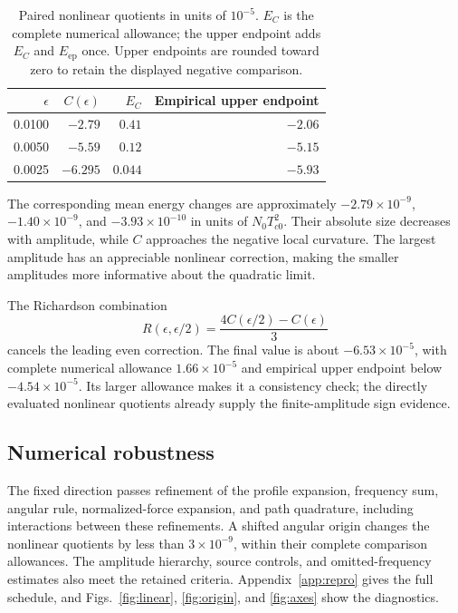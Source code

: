 \documentclass[11pt,a4paper]{article}
\newcommand{\Tc}{T_{c0}}
\begin{document}
\begin{table}[tbp]\centering
\caption{Paired nonlinear quotients in units of $10^{-5}$. $E_C$ is the complete numerical allowance; the upper endpoint adds $E_C$ and $E_{\mathrm{ep}}$ once. Upper endpoints are rounded toward zero to retain the displayed negative comparison.}\label{tab:nonlinear}
\begin{tabular}{rrrr}\toprule
$\epsilon$ & $C(\epsilon)$ & $E_C$ & Empirical upper endpoint\\\midrule
0.0100 & $-2.79$ & $0.41$ & $-2.06$\\
0.0050 & $-5.59$ & $0.12$ & $-5.15$\\
0.0025 & $-6.295$ & $0.044$ & $-5.93$\\\bottomrule
\end{tabular}
\end{table}

The corresponding mean energy changes are approximately $-2.79\times10^{-9}$, $-1.40\times10^{-9}$, and $-3.93\times10^{-10}$ in units of $N_0\Tc^2$. Their absolute size decreases with amplitude, while $C$ approaches the negative local curvature. The largest amplitude has an appreciable nonlinear correction, making the smaller amplitudes more informative about the quadratic limit.

The Richardson combination
\begin{equation}\label{eq:richardson}
 R(\epsilon,\epsilon/2)=\frac{4C(\epsilon/2)-C(\epsilon)}{3}
\end{equation}
cancels the leading even correction. The final value is about $-6.53\times10^{-5}$, with complete numerical allowance $1.66\times10^{-5}$ and empirical upper endpoint below $-4.54\times10^{-5}$. Its larger allowance makes it a consistency check; the directly evaluated nonlinear quotients already supply the finite-amplitude sign evidence.

\subsection{Numerical robustness}
The fixed direction passes refinement of the profile expansion, frequency sum, angular rule, normalized-force expansion, and path quadrature, including interactions between these refinements. A shifted angular origin changes the nonlinear quotients by less than $3\times10^{-9}$, within their complete comparison allowances. The amplitude hierarchy, source controls, and omitted-frequency estimates also meet the retained criteria. Appendix~\ref{app:repro} gives the full schedule, and Figs.~\ref{fig:linear}, \ref{fig:origin}, and \ref{fig:axes} show the diagnostics.
\end{document}
